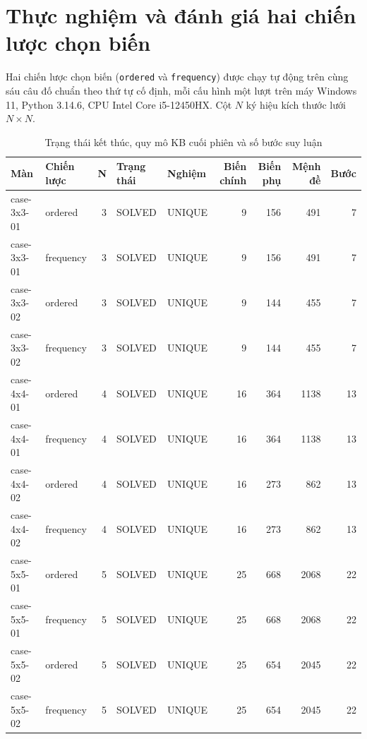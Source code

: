 \section{Thực nghiệm và đánh giá hai chiến lược chọn biến}

Hai chiến lược chọn biến (\texttt{ordered} và \texttt{frequency}) được chạy tự động trên cùng sáu câu đố chuẩn theo thứ tự cố định, mỗi cấu hình một lượt trên máy Windows 11, Python 3.14.6, CPU Intel Core i5-12450HX. Cột $N$ ký hiệu kích thước lưới $N\times N$.

\begin{table}[H]
\centering\footnotesize\singlespacing
\caption{Trạng thái kết thúc, quy mô KB cuối phiên và số bước suy luận}
\smallskip
\renewcommand{\arraystretch}{1.13}
\begin{tabular*}{\linewidth}{@{\extracolsep{\fill}}llrllrrrr@{}}
\toprule
\textbf{Màn} & \textbf{Chiến lược} & \textbf{N} & \textbf{Trạng thái} & \textbf{Nghiệm} & \textbf{Biến chính} & \textbf{Biến phụ} & \textbf{Mệnh đề} & \textbf{Bước} \\
\midrule
case-3x3-01 & ordered & 3 & SOLVED & UNIQUE & 9 & 156 & 491 & 7 \\
case-3x3-01 & frequency & 3 & SOLVED & UNIQUE & 9 & 156 & 491 & 7 \\
case-3x3-02 & ordered & 3 & SOLVED & UNIQUE & 9 & 144 & 455 & 7 \\
case-3x3-02 & frequency & 3 & SOLVED & UNIQUE & 9 & 144 & 455 & 7 \\
case-4x4-01 & ordered & 4 & SOLVED & UNIQUE & 16 & 364 & 1138 & 13 \\
case-4x4-01 & frequency & 4 & SOLVED & UNIQUE & 16 & 364 & 1138 & 13 \\
case-4x4-02 & ordered & 4 & SOLVED & UNIQUE & 16 & 273 & 862 & 13 \\
case-4x4-02 & frequency & 4 & SOLVED & UNIQUE & 16 & 273 & 862 & 13 \\
case-5x5-01 & ordered & 5 & SOLVED & UNIQUE & 25 & 668 & 2068 & 22 \\
case-5x5-01 & frequency & 5 & SOLVED & UNIQUE & 25 & 668 & 2068 & 22 \\
case-5x5-02 & ordered & 5 & SOLVED & UNIQUE & 25 & 654 & 2045 & 22 \\
case-5x5-02 & frequency & 5 & SOLVED & UNIQUE & 25 & 654 & 2045 & 22 \\
\bottomrule
\end{tabular*}
\end{table}

